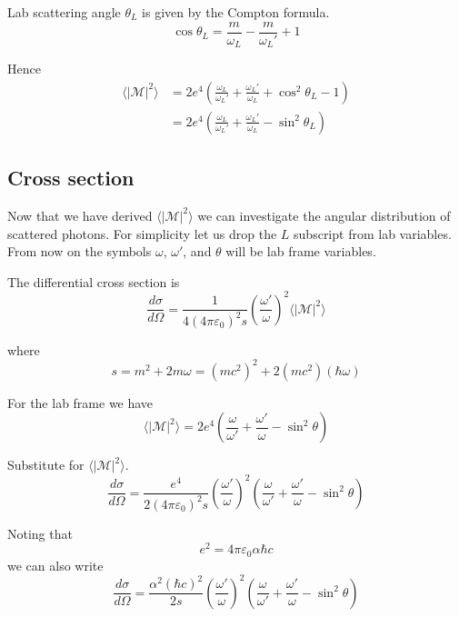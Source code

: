 \documentclass[12pt]{article}
\begin{document}
Lab scattering angle $\theta_L$ is given by the Compton formula.
\begin{equation*}
\cos\theta_L=\frac{m}{\omega_L}-\frac{m}{\omega_L'}+1
\end{equation*}

Hence
\begin{align*}
\langle|\mathcal{M}|^2\rangle
&=2e^4\left(
\frac{\omega_L}{\omega_L'}+\frac{\omega_L'}{\omega_L}+\cos^2\theta_L-1
\right)
\\
&=2e^4\left(
\frac{\omega_L}{\omega_L'}+\frac{\omega_L'}{\omega_L}-\sin^2\theta_L
\right)
\end{align*}

\subsection*{Cross section}
Now that we have derived $\langle|\mathcal{M}|^2\rangle$
we can investigate the angular distribution of scattered photons.
For simplicity let us drop the $L$ subscript from lab variables.
From now on the symbols $\omega$, $\omega'$, and $\theta$ will be lab frame variables.

\bigskip
The differential cross section is
\begin{equation*}
\frac{d\sigma}{d\Omega}=\frac{1}{4(4\pi\varepsilon_0)^2s}
\left(\frac{\omega'}{\omega}\right)^2\langle|\mathcal{M}|^2\rangle
\end{equation*}

where
\begin{equation*}
s=m^2+2m\omega=(mc^2)^2+2(mc^2)(\hbar\omega)
\end{equation*}

For the lab frame we have
\begin{equation*}
\langle|\mathcal{M}|^2\rangle
=2e^4\left(
\frac{\omega}{\omega'}+\frac{\omega'}{\omega}-\sin^2\theta
\right)
\end{equation*}

Substitute for $\langle|\mathcal{M}|^2\rangle$.
\begin{equation*}
\frac{d\sigma}{d\Omega}
=\frac{e^4}{2(4\pi\varepsilon_0)^2s}
\left(\frac{\omega'}{\omega}\right)^2
\left(
\frac{\omega}{\omega'}+\frac{\omega'}{\omega}-\sin^2\theta
\right)
\end{equation*}

Noting that
\begin{equation*}
e^2=4\pi\varepsilon_0\alpha\hbar c
\end{equation*}
we can also write
\begin{equation*}
\frac{d\sigma}{d\Omega}
=\frac{\alpha^2(\hbar c)^2}{2s}
\left(\frac{\omega'}{\omega}\right)^2
\left(
\frac{\omega}{\omega'}+\frac{\omega'}{\omega}-\sin^2\theta
\right)
\end{equation*}
\end{document}
